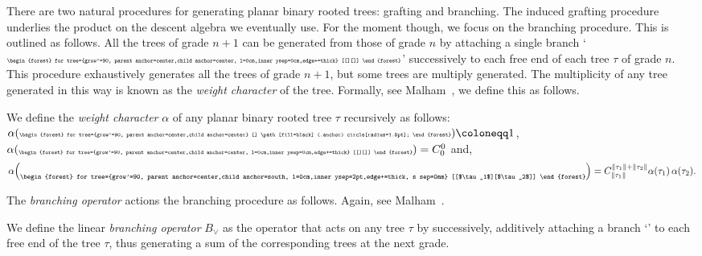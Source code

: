 \documentclass[5p,twocolumn]{elsarticle}
\begin{document}
%
There are two natural procedures for generating planar binary rooted trees: grafting and branching. The induced grafting procedure underlies the product on the descent algebra we eventually use.
For the moment though, we focus on the branching procedure. This is outlined as follows.
All the trees of grade $n+1$ can be generated from those of grade $n$ by attaching a single branch
`${\tiny \begin{forest} for tree={grow'=90, parent anchor=center,child anchor=center, l=0cm,inner ysep=0cm,edge+=thick} [[][]] \end{forest}}$'
successively to each free end of each tree $\tau$ of grade $n$.
This procedure exhaustively generates all the trees of grade $n+1$, but some trees are multiply generated.
The multiplicity of any tree generated in this way is known as the \emph{weight character} of the tree.
Formally, see Malham~\cite{M-coag}, we define this as follows.
%
\begin{definition}\label{def:weightchar}
  We define the \emph{weight character} $\alpha$ of any planar binary rooted tree $\tau$ recursively as follows:
  $\alpha({\tiny \begin{forest} for tree={grow'=90, parent anchor=center,child anchor=center} [] \path[fill=black] (.anchor) circle[radius=1.5pt]; \end{forest}})\coloneqq1$,
  $\alpha(\raisebox{-1pt}{{\tiny \begin{forest} for tree={grow'=90, parent anchor=center,child anchor=center, l=0cm,inner ysep=0cm,edge+=thick} [[][]] \end{forest}}})=C^0_0$ and,
  \begin{equation*}
    \alpha\Bigl(\raisebox{-5pt}{{\scriptsize \begin{forest} for tree={grow'=90, parent anchor=center,child anchor=south, l=0cm,inner ysep=2pt,edge+=thick, s sep=0mm} [[$\tau_1$][$\tau_2$]] \end{forest}}}\Bigr)
    =C^{\|\tau_1\|+\|\tau_2\|}_{\|\tau_1\|} \alpha(\tau_1)\,\alpha(\tau_2).
  \end{equation*}
\end{definition}
%
The \emph{branching operator} actions the branching procedure as follows. Again, see Malham~\cite{M-coag}.
%
\begin{definition}\label{def:branchingoperator}
  We define the linear \emph{branching operator} $B_{\vee}$ as the operator that acts on any tree $\tau$ by successively, additively attaching a branch
  `'
  to each free end of the tree $\tau$, thus generating a sum of the corresponding trees at the next grade.
\end{definition}
%
\end{document}
